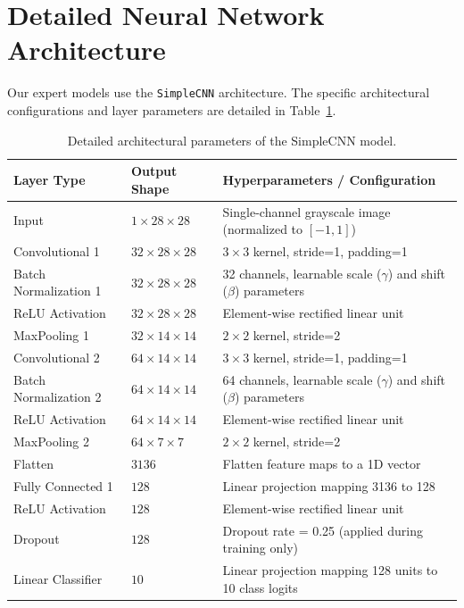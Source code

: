 \documentclass{article}
\theoremstyle{plain}
\theoremstyle{definition}
\theoremstyle{remark}
\begin{document}
\section{Detailed Neural Network Architecture}
Our expert models use the \texttt{SimpleCNN} architecture. The specific architectural configurations and layer parameters are detailed in Table~\ref{tab:architecture}.

\begin{table}[H]
\caption{Detailed architectural parameters of the SimpleCNN model.}
\label{tab:architecture}
\centering
\begin{tabular}{lll}
\toprule
\textbf{Layer Type} & \textbf{Output Shape} & \textbf{Hyperparameters / Configuration} \\
\midrule
Input               & $1 \times 28 \times 28$ & Single-channel grayscale image (normalized to $[-1, 1]$) \\
Convolutional 1      & $32 \times 28 \times 28$ & $3 \times 3$ kernel, stride=1, padding=1 \\
Batch Normalization 1 & $32 \times 28 \times 28$ & 32 channels, learnable scale ($\gamma$) and shift ($\beta$) parameters \\
ReLU Activation     & $32 \times 28 \times 28$ & Element-wise rectified linear unit \\
MaxPooling 1        & $32 \times 14 \times 14$ & $2 \times 2$ kernel, stride=2 \\
Convolutional 2      & $64 \times 14 \times 14$ & $3 \times 3$ kernel, stride=1, padding=1 \\
Batch Normalization 2 & $64 \times 14 \times 14$ & 64 channels, learnable scale ($\gamma$) and shift ($\beta$) parameters \\
ReLU Activation     & $64 \times 14 \times 14$ & Element-wise rectified linear unit \\
MaxPooling 2        & $64 \times 7 \times 7$  & $2 \times 2$ kernel, stride=2 \\
Flatten             & $3136$                  & Flatten feature maps to a 1D vector \\
Fully Connected 1   & $128$                   & Linear projection mapping 3136 to 128 \\
ReLU Activation     & $128$                   & Element-wise rectified linear unit \\
Dropout             & $128$                   & Dropout rate = 0.25 (applied during training only) \\
Linear Classifier   & $10$                    & Linear projection mapping 128 units to 10 class logits \\
\bottomrule
\end{tabular}
\end{table}
\end{document}
